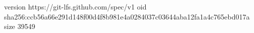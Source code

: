 version https://git-lfs.github.com/spec/v1
oid sha256:ccb56a66e291d148f00d4f8b981e4a0284037c03644aba12fa1a4c765ebd017a
size 39549

